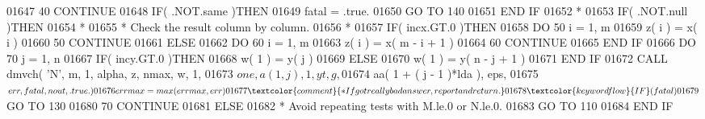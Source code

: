 \begin{DoxyCode}
01647    40                \textcolor{keywordflow}{CONTINUE}
01648                      \textcolor{keywordflow}{IF}( .NOT.same )\textcolor{keywordflow}{THEN}
01649                         fatal = .true.
01650                         \textcolor{keywordflow}{GO TO} 140
01651 \textcolor{keywordflow}{                     END IF}
01652 \textcolor{comment}{*}
01653                      \textcolor{keywordflow}{IF}( .NOT.null )\textcolor{keywordflow}{THEN}
01654 \textcolor{comment}{*}
01655 \textcolor{comment}{*                       Check the result column by column.}
01656 \textcolor{comment}{*}
01657                         \textcolor{keywordflow}{IF}( incx.GT.0 )\textcolor{keywordflow}{THEN}
01658                            \textcolor{keywordflow}{DO} 50 i = 1, m
01659                               z( i ) = x( i )
01660    50                      \textcolor{keywordflow}{CONTINUE}
01661                         \textcolor{keywordflow}{ELSE}
01662                            \textcolor{keywordflow}{DO} 60 i = 1, m
01663                               z( i ) = x( m - i + 1 )
01664    60                      \textcolor{keywordflow}{CONTINUE}
01665 \textcolor{keywordflow}{                        END IF}
01666                         \textcolor{keywordflow}{DO} 70 j = 1, n
01667                            \textcolor{keywordflow}{IF}( incy.GT.0 )\textcolor{keywordflow}{THEN}
01668                               w( 1 ) = y( j )
01669                            \textcolor{keywordflow}{ELSE}
01670                               w( 1 ) = y( n - j + 1 )
01671 \textcolor{keywordflow}{                           END IF}
01672                            \textcolor{keyword}{CALL }dmvch( \textcolor{stringliteral}{'N'}, m, 1, alpha, z, nmax, w, 1,
01673      $                                 one, a( 1, j ), 1, yt, g,
01674      $                                 aa( 1 + ( j - 1 )*lda ), eps,
01675      $                                 err, fatal, nout, .true. )
01676                            errmax = max( errmax, err )
01677 \textcolor{comment}{*                          If got really bad answer, report and return.}
01678                            \textcolor{keywordflow}{IF}( fatal )
01679      $                        \textcolor{keywordflow}{GO TO} 130
01680    70                   \textcolor{keywordflow}{CONTINUE}
01681                      \textcolor{keywordflow}{ELSE}
01682 \textcolor{comment}{*                       Avoid repeating tests with M.le.0 or N.le.0.}
01683                         \textcolor{keywordflow}{GO TO} 110
01684 \textcolor{keywordflow}{                     END IF}

\end{DoxyCode}
